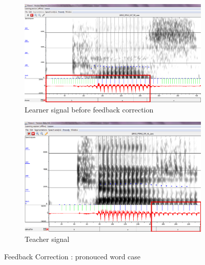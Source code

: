 \documentclass[11pt]{beamer}
\begin{document}

\begin{frame}

\begin{figure}
\begin{subfigure}{.5\textwidth}
  \centering
  \includegraphics[width=0.9\linewidth]{images/case_learner-nonFricative.PNG}
  \caption{Learner signal before feedback correction}
  \label{fig:sfig1}
\end{subfigure}%
\begin{subfigure}{.5\textwidth}
  \centering
  \includegraphics[width=0.9\linewidth]{images/teacher_case_pitchMarks.PNG}
  \caption{Teacher signal}
  \label{fig:sfig2}
\end{subfigure}
\caption{Feedback Correction : pronouced word case}
\label{fig:fig}
\end{figure}
\end{frame}
\end{document}
